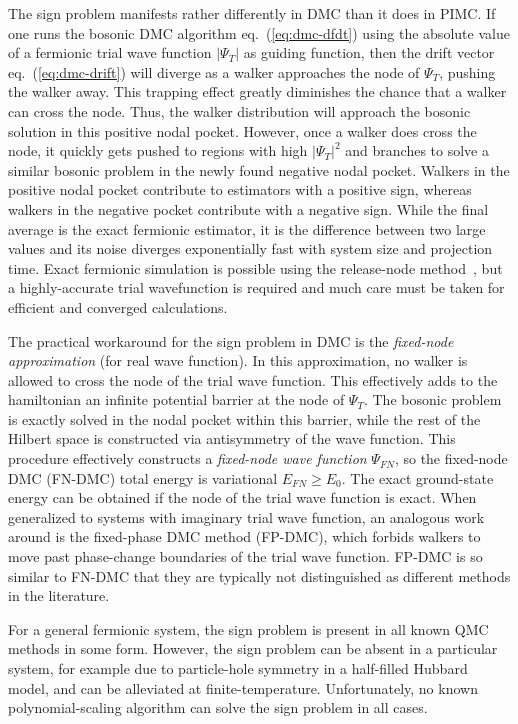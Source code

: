 The sign problem manifests rather differently in DMC than it does in PIMC.
If one runs the bosonic DMC algorithm eq.~(\ref{eq:dmc-dfdt}) using the absolute value of a fermionic trial wave function $\vert\Psi_T\vert$ as guiding function, then the drift vector eq.~(\ref{eq:dmc-drift}) will diverge as a walker approaches the node of $\Psi_T$, pushing the walker away.
This trapping effect greatly diminishes the chance that a walker can cross the node.
Thus, the walker distribution will approach the bosonic solution in this positive nodal pocket.
However, once a walker does cross the node, it quickly gets pushed to regions with high $\vert\Psi_T\vert^2$ and branches to solve a similar bosonic problem in the newly found negative nodal pocket.
Walkers in the positive nodal pocket contribute to estimators with a positive sign, whereas walkers in the negative pocket contribute with a negative sign.
While the final average is the exact fermionic estimator, it is the difference between two large values and its noise diverges exponentially fast with system size and projection time.
Exact fermionic simulation is possible using the release-node method~\cite{Ceperley1978}, but a highly-accurate trial wavefunction is required and much care must be taken for efficient and converged calculations.

The practical workaround for the sign problem in DMC is the \textit{fixed-node approximation} (for real wave function).
In this approximation, no walker is allowed to cross the node of the trial wave function.
This effectively adds to the hamiltonian an infinite potential barrier at the node of $\Psi_T$.
The bosonic problem is exactly solved in the nodal pocket within this barrier, while the rest of the Hilbert space is constructed via antisymmetry of the wave function.
This procedure effectively constructs a \emph{fixed-node wave function} $\Psi_{FN}$, so the fixed-node DMC (FN-DMC) total energy is variational $E_{FN}\ge E_0$.
The exact ground-state energy can be obtained if the node of the trial wave function is exact.
When generalized to systems with imaginary trial wave function, an analogous work around is the fixed-phase DMC method (FP-DMC), which forbids walkers to move past phase-change boundaries of the trial wave function.
FP-DMC is so similar to FN-DMC that they are typically not distinguished as different methods in the literature.

For a general fermionic system, the sign problem is present in all known QMC methods in some form.
However, the sign problem can be absent in a particular system, for example due to particle-hole symmetry in a half-filled Hubbard model, and can be alleviated at finite-temperature.
Unfortunately, no known polynomial-scaling algorithm can solve the sign problem in all cases.